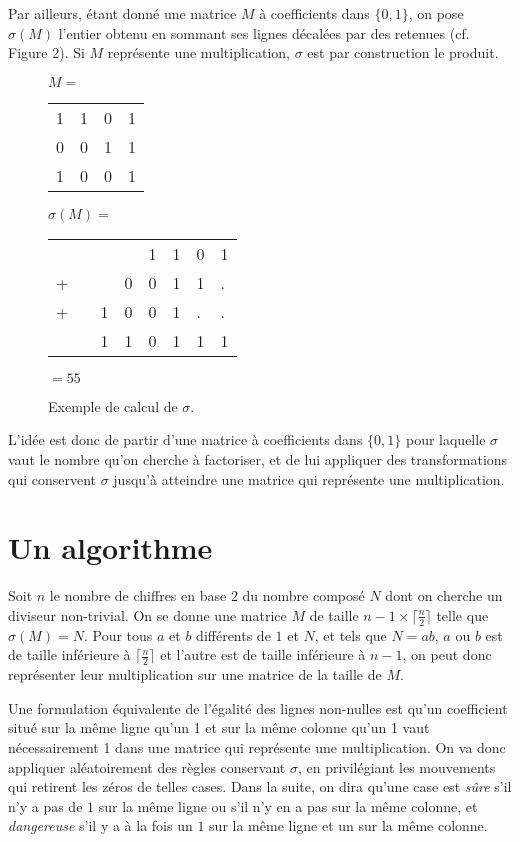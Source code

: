 \documentclass[11pt, openany]{article}
\begin{document}
Par ailleurs, étant donné une matrice $M$ à coefficients dans $\{0,1\}$, on pose $\sigma(M)$ l'entier obtenu en sommant ses lignes décalées par des retenues (cf. Figure 2). Si $M$ représente une multiplication, $\sigma$ est par construction le produit. 

\begin{figure}[]
\centering
\begin{minipage}[]{0.3\linewidth}
$M=$
\begin{tabular}{cccc}
1&1&0&1\\
0&0&1&1\\
1&0&0&1\\
\end{tabular}
\end{minipage}
\quad
\begin{minipage}[]{0.6\linewidth}
$\sigma(M)=$
\begin{tabular}{llllllll}
&&&&1&1&0&1\\
+&&&0&0&1&1&.\\
+&&1&0&0&1&.&.\\
\hline
&&1&1&0&1&1&1\\
\end{tabular}
$=55$
\end{minipage}
\caption{Exemple de calcul de $\sigma$.}

\end{figure}

L'idée est donc de partir d'une matrice à coefficients dans $\{0,1\}$ pour laquelle $\sigma$ vaut le nombre qu'on cherche à factoriser, et de lui appliquer des transformations qui conservent $\sigma$ jusqu'à atteindre une matrice qui représente une multiplication.

\section*{Un algorithme}

Soit $n$ le nombre de chiffres en base $2$ du nombre composé $N$ dont on cherche un diviseur non-trivial. On se donne une matrice $M$ de taille $ n-1 \times \lceil \frac{n}{2}\rceil$ telle que $\sigma(M)=N$. Pour tous $a$ et $b$ différents de $1$ et $N$, et tels que $N = ab$, $a$ ou $b$ est de taille inférieure à $\lceil\frac{n}{2}\rceil$ et l'autre est de taille inférieure à $n-1$, on peut donc représenter leur multiplication sur une matrice de la taille de $M$.

Une formulation équivalente de l'égalité des lignes non-nulles est qu'un coefficient situé sur la même ligne qu'un 1 et sur la même colonne qu'un 1 vaut nécessairement 1 dans une matrice qui représente une multiplication. On va donc appliquer aléatoirement des règles conservant $\sigma$, en privilégiant les mouvements qui retirent les zéros de telles cases. Dans la suite, on dira qu'une case est \emph{sûre} s'il n'y a pas de $1$ sur la même ligne ou s'il n'y en a pas sur la même colonne, et \emph{dangereuse} s'il y a à la fois un $1$ sur la même ligne et un sur la même colonne.
\end{document}
